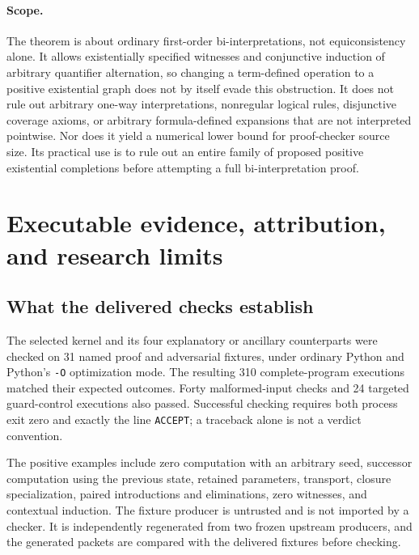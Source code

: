 \documentclass[11pt,letterpaper]{article}
\theoremstyle{definition}\newtheorem{definition}[theorem]{Definition}
\theoremstyle{remark}\newtheorem{remark}[theorem]{Remark}
\begin{document}
\paragraph{Scope.}
The theorem is about ordinary first-order bi-interpretations, not
equiconsistency alone.  It allows existentially specified witnesses and
conjunctive induction of arbitrary quantifier alternation, so changing
a term-defined operation to a positive existential graph does not by
itself evade this obstruction.
It does not rule out arbitrary one-way interpretations, nonregular
logical rules, disjunctive coverage axioms, or arbitrary formula-defined
expansions that are not interpreted pointwise.  Nor does it yield a
numerical lower bound for proof-checker source size.  Its practical use
is to rule out an entire family of proposed positive existential
completions before attempting a full bi-interpretation proof.



\section{Executable evidence, attribution, and research limits}
\label{sec:validation}

\subsection{What the delivered checks establish}

The selected kernel and its four explanatory or ancillary counterparts
were checked on 31 named proof and adversarial fixtures, under ordinary
Python and Python's \texttt{-O} optimization mode. The resulting 310
complete-program executions matched their expected outcomes. Forty
malformed-input checks and 24 targeted guard-control executions also
passed. Successful checking requires both process exit zero and exactly
the line \texttt{ACCEPT}; a traceback alone is not a verdict convention.

The positive examples include zero computation with an arbitrary seed,
successor computation using the previous state, retained parameters,
transport, closure specialization, paired introductions and eliminations,
zero witnesses, and contextual induction. The fixture producer is
untrusted and is not imported by a checker. It is independently
regenerated from two frozen upstream producers, and the generated
packets are compared with the delivered fixtures before checking.
\end{document}
